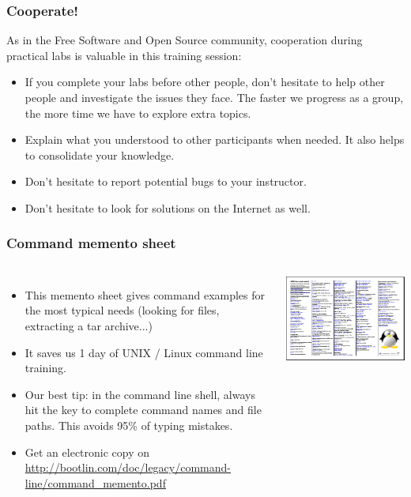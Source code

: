 \begin{frame}
\frametitle{Cooperate!}
As in the Free Software and Open Source community,
cooperation during practical labs is valuable in this training session:
\begin{itemize}
\item If you complete your labs before other people, don't hesitate to help
other people and investigate the issues they face. The faster we progress as a
group, the more time we have to explore extra topics.
\item Explain what you understood to other participants when needed.
It also helps to consolidate your knowledge.
\item Don't hesitate to report potential bugs to your instructor.
\item Don't hesitate to look for solutions on the Internet as well.
\end{itemize}
\end{frame}

\begin{frame}
  \frametitle{Command memento sheet}
  \begin{columns}
    \begin{itemize}
       \item This memento sheet gives command examples for the most
       typical needs (looking for files, extracting a tar archive...)
       \item It saves us 1 day of UNIX / Linux command line training.
       \item Our best tip: in the command line shell, always hit the
        key to complete command names and file paths.
       This avoids 95\% of typing mistakes.
       \item Get an electronic copy on
       \url{http://bootlin.com/doc/legacy/command-line/command_memento.pdf}
    \end{itemize}
    \includegraphics[width=\textwidth]{slides/course-information/command_memento.png}
  \end{columns}
\end{frame}

